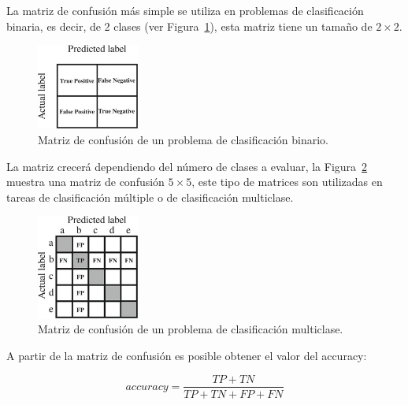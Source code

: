La matriz de confusión más simple se utiliza en problemas de clasificación binaria, es decir, de 2 clases (ver Figura~\ref{fig:MatrizConfusionBinario}), esta matriz tiene un tamaño de $2 \times 2$.

\begin{figure}[H]
    \begin{center}
        \includegraphics[width=0.3\textwidth]{Images/2-matriz-confusion-binario.png}
    \end{center}
    \caption{Matriz de confusión de un problema de clasificación binario.}
    \label{fig:MatrizConfusionBinario}
\end{figure}

La matriz crecerá dependiendo del número de clases a evaluar, la Figura~\ref{fig:MatrizConfusion} muestra una matriz de confusión $5 \times 5 $, este tipo de matrices son utilizadas en tareas de clasificación múltiple o de clasificación multiclase.

\begin{figure}[H]
    \begin{center}
        \includegraphics[width=0.3\textwidth]{Images/2-matriz-confusion.png}
    \end{center}
    \caption{Matriz de confusión de un problema de clasificación multiclase.}
    \label{fig:MatrizConfusion}
\end{figure}

A partir de la matriz de confusión es posible obtener el valor del accuracy:

\begin{equation}
    accuracy = \frac{TP + TN}{TP + TN + FP + FN}
\end{equation}

